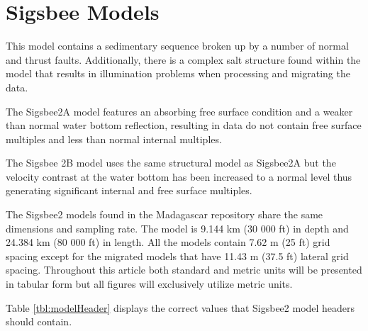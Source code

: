 {
\tiny

\normalsize
}

\section{Sigsbee Models}
This model contains a sedimentary sequence broken up by a number of normal and thrust faults.  Additionally, there is a complex 
salt structure found within the model that results in illumination problems when processing and migrating the data.   

The Sigsbee2A model features an absorbing free surface condition and a weaker than normal water bottom reflection, 
resulting in data do not contain free surface multiples and less than normal internal multiples.  

The Sigsbee 2B model uses the same structural model as Sigsbee2A but the velocity contrast at the water bottom has been 
increased to a normal level thus generating significant internal and free surface multiples. 

The Sigsbee2 models found in the Madagascar repository share the same dimensions and sampling rate.  The model is 9.144 km (30 000 ft) in 
depth and 24.384 km (80 000 ft) in length.  All the models contain 7.62 m (25 ft) grid spacing except for the migrated models that have
11.43 m (37.5 ft) lateral grid spacing.  Throughout this article both standard and metric units will be presented in tabular form but all
figures will exclusively utilize metric units.   

Table \ref{tbl:modelHeader} displays the correct values that Sigsbee2 model headers should contain. 


